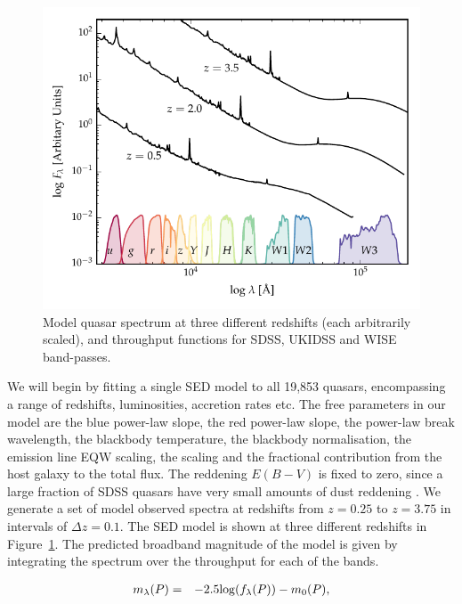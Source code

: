\begin{figure}
  \centering
  \includegraphics[width=\textwidth]{figures/chapter05/throughput.pdf}
  \caption[{Model quasar spectrum at three different redshifts, and throughput functions for SDSS, UKIDSS and WISE band-passes.}]{Model quasar spectrum at three different redshifts (each arbitrarily scaled), and throughput functions for SDSS, UKIDSS and WISE band-passes.}
  \label{fig:filters}
\end{figure}

We will begin by fitting a single SED model to all 19,853 quasars, encompassing a range of redshifts, luminosities, accretion rates etc. 
The free parameters in our model are the blue power-law slope, the red power-law slope, the power-law break wavelength, the blackbody temperature, the blackbody normalisation, the emission line EQW scaling, the \ha scaling and the fractional contribution from the host galaxy to the total flux. 
The reddening $E(B-V)$ is fixed to zero, since a large fraction of SDSS quasars have very small amounts of dust reddening \citep{richards03}. 
We generate a set of model observed spectra at redshifts from $z=0.25$ to $z=3.75$ in intervals of $\Delta z = 0.1$. 
The SED model is shown at three different redshifts in Figure~\ref{fig:filters}. 
The predicted broadband magnitude of the model is given by integrating the spectrum over the throughput for each of the bands.  

\begin{eqnarray}
  m_\lambda(P) & = & -2.5{\rm log}(f_\lambda(P)) - m_0(P), 
\end{eqnarray}

